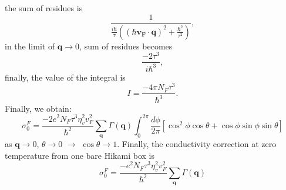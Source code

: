 \documentclass[aps,prb,amsmath,amssymb,footinbib,showpacs,twocolumn]{revtex4-2}
\begin{document}
\begin{widetext}
\begin{equation}
\end{equation}
the sum of residues is 
\begin{equation}
    \frac{1}{\frac{i\hbar}{\tau}((\hbar \mathbf{v_{F}\cdot q})^{2}+\frac{\hbar^{2}}{\tau^{2}})},
\end{equation}
in the limit of $\mathbf{q}\to 0$, sum of residues becomes
\begin{equation}
    \frac{-2\tau^{3}}{i\hbar^{3}},
\end{equation}
finally, the value of  the integral is
\begin{equation}
    I= \frac{-4\pi N_{F}\tau^{3}}{\hbar^{3}}.
\end{equation}
Finally, we obtain:
\begin{equation}
     \sigma_{0}^{F}=\frac{-2e^{2}N_{F}\tau^{3}\eta^{2}_{v}v^{2}_{F}}{\hbar^{2}}\sum_{\textbf{q}}\Gamma(\textbf{q})\int_{0}^{2\pi}\frac{d\phi}{2\pi}[\cos^{2}\phi\cos\theta+\cos\phi\sin\phi\sin\theta]
\end{equation}
as $\mathbf{q}\to 0$, $\theta \to 0$ $\to$ $\cos\theta \to 1$. Finally, the conductivity correction at zero temperature from  one bare Hikami box is 
\begin{equation}
    \sigma_{0}^{F}=\frac{-e^{2}N_{F}\tau^{3}\eta^{2}_{v}v^{2}_{F}}{\hbar^{2}}\sum_{\textbf{q}}\Gamma(\textbf{q})
\end{equation}

\end{widetext}
\end{document}
